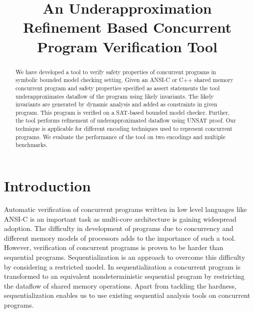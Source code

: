 \documentclass{llncs}
\begin{document}
\pagestyle{empty}

\mainmatter

\title{An Underapproximation Refinement Based Concurrent Program Verification Tool}



\maketitle

\begin{abstract}
\label{sect:abstract}
We have developed a tool to verify safety properties of concurrent programs in symbolic bounded model checking setting. Given an ANSI-C or C++ shared memory concurrent program and safety properties specified as assert statements the tool underapproximates dataflow of the program using likely invariants. The likely invariants are generated by dynamic analysis and added as constraints in given program. This program is verified on a SAT-based bounded model checker. Further, the tool performs refinement of underapproximated dataflow using UNSAT proof. Our technique is applicable for different encoding techniques used to represent concurrent programs. We evaluate the performance of the tool on two encodings and multiple benchmarks.
\end{abstract}

\section{Introduction}
\label{sect:introduction}
Automatic verification of concurrent programs written in low level languages like ANSI-C is an important task as multi-core architecture is gaining widespread adoption. The difficulty in development of programs due to concurrency and different memory models of processors adds to the importance of such a tool. However, verification of concurrent programs is proven to be harder than sequential programs\cite{rama}. Sequentialization is an approach to overcome this difficulty by considering a restricted model. In sequentialization a concurrent program is transformed to an equivalent nondeterministic sequential program by restricting the dataflow of shared memory operations. Apart from tackling the hardness, sequentialization enables us to use existing sequential analysis tools on concurrent programs.
\end{document}
